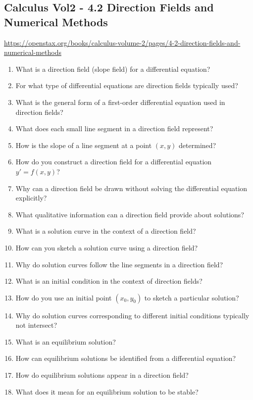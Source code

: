 \subsection{Calculus Vol2 - 4.2 Direction Fields and Numerical Methods}

\url{https://openstax.org/books/calculus-volume-2/pages/4-2-direction-fields-and-numerical-methods}

\begin{enumerate}
  \item What is a direction field (slope field) for a differential equation?
  \item For what type of differential equations are direction fields typically used?
  \item What is the general form of a first-order differential equation used in direction fields?
  \item What does each small line segment in a direction field represent?
  \item How is the slope of a line segment at a point $(x,y)$ determined?
  \item How do you construct a direction field for a differential equation $y' = f(x,y)$?
  \item Why can a direction field be drawn without solving the differential equation explicitly?
  \item What qualitative information can a direction field provide about solutions?
  \item What is a solution curve in the context of a direction field?
  \item How can you sketch a solution curve using a direction field?
  \item Why do solution curves follow the line segments in a direction field?
  \item What is an initial condition in the context of direction fields?
  \item How do you use an initial point $(x_0,y_0)$ to sketch a particular solution?
  \item Why do solution curves corresponding to different initial conditions typically not intersect?
  \item What is an equilibrium solution?
  \item How can equilibrium solutions be identified from a differential equation?
  \item How do equilibrium solutions appear in a direction field?
  \item What does it mean for an equilibrium solution to be stable?

\end{enumerate}
